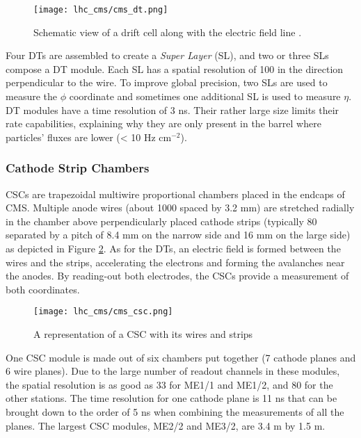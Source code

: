                 \begin{figure}[h!]
                    \centering
                    \texttt{[image: lhc\_cms/cms\_dt.png]}
                    \caption{Schematic view of a drift cell along with the electric field line \Cite{CMS_at_LHC}.}
                    \label{fig:muon_chambers__dt}
                \end{figure}

                Four DTs are assembled to create a \emph{Super Layer} (SL), and two or three SLs compose a DT module. Each SL has a spatial resolution of 100 \um{} in the direction perpendicular to the wire. To improve global precision, two SLs are used to measure the $ \phi $ coordinate and sometimes one additional SL is used to measure $ \eta $. DT modules have a time resolution of 3 ns. Their rather large size limits their rate capabilities, explaining why they are only present in the barrel where particles' fluxes are lower (< 10 Hz cm$ ^{-2} $).

            \subsubsection{Cathode Strip Chambers}

                CSCs are trapezoidal multiwire proportional chambers placed in the endcaps of CMS. Multiple anode wires (about 1000 spaced by 3.2 mm) are stretched radially in the chamber above perpendicularly placed cathode strips (typically 80 separated by a pitch of 8.4 mm on the narrow side and 16 mm on the large side) as depicted in Figure \ref{fig:muon_chambers__csc}. As for the DTs, an electric field is formed between the wires and the strips, accelerating the electrons and forming the avalanches near the anodes. By reading-out both electrodes, the CSCs provide a measurement of both coordinates.

                \begin{figure}[h!]
                    \centering
                    \texttt{[image: lhc\_cms/cms\_csc.png]}
                    \caption{A representation of a CSC with its wires and strips \Cite{CMS_Performances}}
                    \label{fig:muon_chambers__csc}
                \end{figure}

                One CSC module is made out of six chambers put together (7 cathode planes and 6 wire planes). Due to the large number of readout channels in these modules, the spatial resolution is as good as 33 \um{} for ME1/1 and ME1/2, and 80 \um{} for the other stations. The time resolution for one cathode plane is 11 ns that can be brought down to the order of 5 ns when combining the measurements of all the planes. The largest CSC modules, ME2/2 and ME3/2, are 3.4 m by 1.5 m. \\ 


